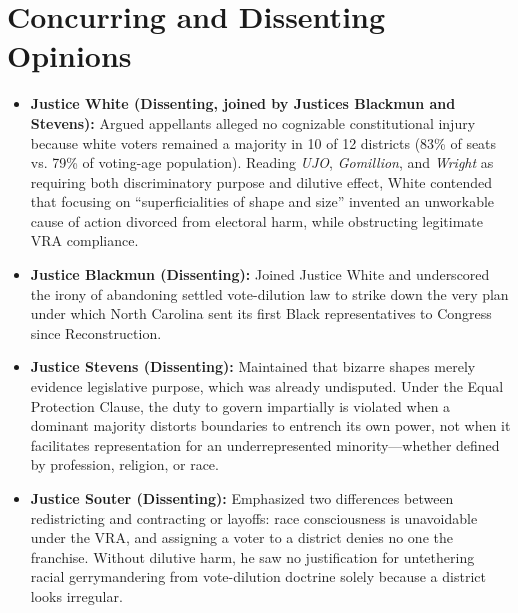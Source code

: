 \documentclass[12pt]{article}
\begin{document}
\section{Concurring and Dissenting Opinions}
\begin{itemize}
  \item \textbf{Justice White (Dissenting, joined by Justices Blackmun and Stevens):} Argued appellants alleged no cognizable constitutional injury because white voters remained a majority in 10 of 12 districts (83\% of seats vs. 79\% of voting-age population). Reading \textit{UJO}, \textit{Gomillion}, and \textit{Wright} as requiring both discriminatory purpose and dilutive effect, White contended that focusing on ``superficialities of shape and size'' invented an unworkable cause of action divorced from electoral harm, while obstructing legitimate VRA compliance.
  \item \textbf{Justice Blackmun (Dissenting):} Joined Justice White and underscored the irony of abandoning settled vote-dilution law to strike down the very plan under which North Carolina sent its first Black representatives to Congress since Reconstruction.
  \item \textbf{Justice Stevens (Dissenting):} Maintained that bizarre shapes merely evidence legislative purpose, which was already undisputed. Under the Equal Protection Clause, the duty to govern impartially is violated when a dominant majority distorts boundaries to entrench its own power, not when it facilitates representation for an underrepresented minority---whether defined by profession, religion, or race.
  \item \textbf{Justice Souter (Dissenting):} Emphasized two differences between redistricting and contracting or layoffs: race consciousness is unavoidable under the VRA, and assigning a voter to a district denies no one the franchise. Without dilutive harm, he saw no justification for untethering racial gerrymandering from vote-dilution doctrine solely because a district looks irregular.
\end{itemize}
\end{document}
